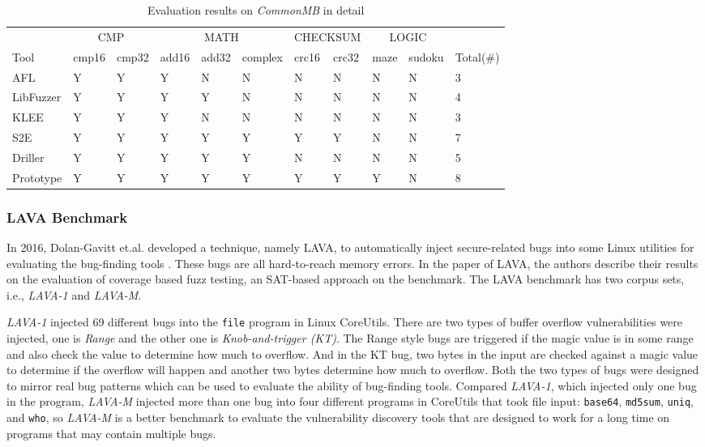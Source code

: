 \begin{table}
  \caption{\label{CommonMB-results-detail}Evaluation results on \textit{CommonMB} in detail}
  \centering
	\begin{tabular}{p{1.5cm}<{\centering} | p{0.8cm}<{\centering} p{0.9cm}<{\centering} | p{0.7cm}<{\centering}
	p{0.7cm}<{\centering} p{1.2cm}<{\centering} | p{0.8cm}<{\centering} p{0.8cm}<{\centering} | p{0.8cm}<{\centering} p{1cm}<{\centering} | p{1.2cm}<{\centering}}
		\toprule
	& \multicolumn{2}{c}{CMP}  & \multicolumn{3}{c}{MATH} & \multicolumn{2}{c}{CHECKSUM} & 	\multicolumn{2}{c}{LOGIC} & \\ 
	    Tool & cmp16 & cmp32 & add16 & add32 & complex & crc16 & crc32 & maze & sudoku & Total(\#) \\
		\midrule
		AFL 		& Y & Y & Y & N & N & N & N & N & N & 3 \\
		LibFuzzer	& Y & Y & Y & Y & N & N & N & N & N & 4\\
		KLEE		& Y & Y & Y & N & N & N & N & N & N & 3\\
		S2E			& Y & Y & Y & Y & Y & Y & Y & N & N & 7\\
		Driller		& Y & Y & Y & Y & Y & N & N & N & N & 5\\
		Prototype	& Y & Y & Y & Y & Y & Y & Y & Y & N & 8\\
	 \bottomrule
	\end{tabular}
\end{table}

\subsubsection{LAVA Benchmark}
\noindent In 2016, Dolan-Gavitt et.al. developed a technique, namely LAVA, to automatically inject secure-related bugs into some Linux utilities for evaluating the bug-finding tools \cite{dolan2016lava}. These bugs are all hard-to-reach memory errors. In the paper of LAVA, the authors describe their results on the evaluation of coverage based fuzz testing, an SAT-based approach on the benchmark. The LAVA benchmark has two corpus sets, i.e., \textit{LAVA-1} and \textit{LAVA-M}.

\textit{LAVA-1} injected 69 different bugs into the \texttt{file} program in Linux CoreUtils. There are two types of buffer overflow vulnerabilities were injected, one is \emph{Range} and the other one is \emph{Knob-and-trigger (KT)}. The Range style bugs are triggered if the magic value is in some range and also check the value to determine how much to overflow. And in the KT bug, two bytes in the input are checked against a magic value to determine if the overflow will happen and another two bytes determine how much to overflow. Both the two types of bugs were designed to mirror real bug patterns which can be used to evaluate the ability of bug-finding tools. Compared \textit{LAVA-1}, which injected only one bug in the program, \textit{LAVA-M} injected more than one bug into four different programs in CoreUtils that took file input: \texttt{base64}, \texttt{md5sum}, \texttt{uniq}, and \texttt{who}, so \textit{LAVA-M} is a better benchmark to evaluate the vulnerability discovery tools that are designed to work for a long time on programs that may contain multiple bugs.

